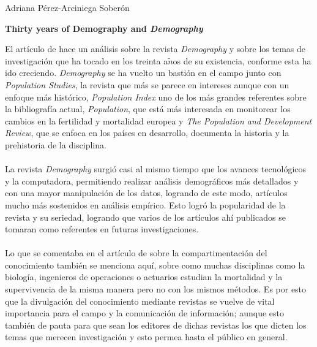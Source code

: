\documentclass[11pt,spanish,letterpaper]{article}
\theoremstyle{plain}
\begin{document}
\begin{flushleft}
Adriana P\'erez-Arciniega Sober\'on
\end{flushleft}
\begin{center}
\textbf{Thirty years of Demography and \textit{Demography}}
\end{center} 
El art\'iculo de \cite{keyfitz1993thirty} hace un an\'alisis sobre la revista \textit{Demography} y sobre los temas de investigaci\'on que ha tocado en los treinta a$\tilde{n}$os de su existencia, conforme esta ha ido creciendo. \textit{Demography} se ha vuelto un basti\'on en el campo junto con \textit{Population Studies}, la revista que m\'as se parece en intereses aunque con un enfoque m\'as hist\'orico, \textit{Population Index} uno de los m\'as grandes referentes sobre la bibliograf\'ia actual, \textit{Population}, que est\'a m\'as interesada en monitorear los cambios en la fertilidad y mortalidad europea y \textit{The Population and Development Review},  que se enfoca en los pa\'ises  en  desarrollo,  documenta  la  historia  y  la  prehistoria  de  la  disciplina.\\
\\
La revista \textit{Demography} surgi\'o casi al mismo tiempo que los avances tecnol\'ogicos y la computadora, permitiendo realizar an\'alisis demogr\'aficos m\'as detallados y con una mayor manipulaci\'on de los datos, logrando de este modo, art\'iculos mucho m\'as sostenidos en an\'alisis emp\'irico. Esto logr\'o la popularidad de la revista y su seriedad, logrando que varios de los art\'iculos ah\'i publicados se tomaran como referentes en futuras investigaciones.\\
\\
Lo que se comentaba en el art\'iculo de \cite{poirier1999trente} sobre la compartimentaci\'on del conocimiento tambi\'en se menciona aqu\'i, sobre como muchas disciplinas como la biolog\'ia, ingenieros de operaciones o actuarios estudian la mortalidad y la supervivencia de la misma manera pero no con los mismos m\'etodos. Es por esto que la divulgaci\'on del conocimiento mediante revistas se vuelve de vital importancia para el campo y la comunicaci\'on de informaci\'on; aunque esto tambi\'en de pauta para que sean los editores de dichas revistas los que dicten los temas que merecen investigaci\'on y esto permea hasta el p\'ublico en general.\\
\\
\end{document}
